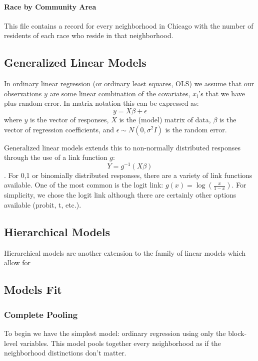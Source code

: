 \documentclass{IEEEtran}
\begin{document}
\paragraph{ Race by Community Area }
This file contains a record for every neighborhood in Chicago with the number of residents of each race who reside in that neighborhood. 

\subsection{Generalized Linear Models}

In ordinary linear regression (or ordinary least squares, OLS) we assume that our observations $y$ are some linear combination of the covariates, $x_i$'s that we have plus random error. In matrix notation this can be expressed as: $$y = X\beta + \epsilon$$ where $y$ is the vector of responses, $X$ is the (model) matrix of data, $\beta$ is the vector of regression coefficients, and $\epsilon \sim N(0, \sigma^2 I)$ is the random error.

Generalized linear models extends this to non-normally distributed responses through the use of a link function $g$: $$Y = g^{-1}(X\beta)$$. For {0,1} or binomially distributed responses, there are a variety of link functions available. One of the most common is the logit link: $g(x) = \log(\frac{x}{1-x})$. For simplicity, we chose the logit link although there are certainly other options available (probit, t, etc.). 

\subsection{Hierarchical Models}

Hierarchical models are another extension to the family of linear models which allow for 

\subsection{Models Fit}

\subsubsection{Complete Pooling}

To begin we have the simplest model: ordinary regression using only the block-level variables. This model pools together every neighborhood as if the neighborhood distinctions don't matter. 
\end{document}
